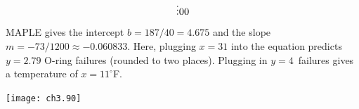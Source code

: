 \begin{ans}{6}
\begin{exparts}
\begin{equation*}
{%
                     \vdots \\
                     0 \\
                     0}
          \end{equation*}
          MAPLE gives the intercept $b=187/40=4.675$ and the
          slope $m=-73/1200\approx -0.060833$.
          Here, plugging $x=31$ into the equation predicts
          $y=2.79$ O-ring failures (rounded to two places).
          Plugging in $y=4$~failures gives a temperature of
          $x=11^\circ$F.
     \begin{center}  \small
       \texttt{[image: ch3.90]}
      \end{center}
      \end{exparts}
    
\end{ans}
